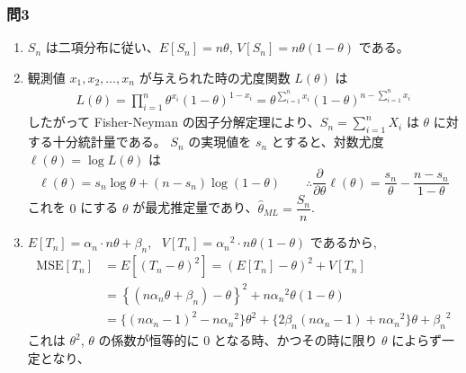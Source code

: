\documentclass[./main.tex]{subfiles}
\begin{document}
    \subsubsection*{問3}

    \begin{enumerate}
        \item $S_n$ は二項分布に従い、$E[ S_n ] = n \theta$, $V[S_n] = n \theta (1 - \theta)$ である。
        \item 観測値 $x_1, x_2, \dots, x_n$ が与えられた時の尤度関数 $L(\theta)$ は
        \begin{align*}
            L(\theta)
                = \prod_{i=1}^{n} \theta^{x_i} (1 - \theta)^{1 - x_i}
                = \theta^{\sum_{i=1}^{n} x_i} (1 - \theta)^{n -\sum_{i=1}^{n} x_i}
        \end{align*}
        したがって Fisher-Neyman の因子分解定理により、$S_n = \displaystyle \sum_{i=1}^n X_i$ は $\theta$ に対する十分統計量である。
        $S_n$ の実現値を $s_n$ とすると、対数尤度 $\ell (\theta) = \log L(\theta)$ は
        \begin{equation*}
            \ell (\theta)
                = s_n \log \theta + (n - s_n) \log (1-\theta)
            \qquad
            \therefore
            \frac{\partial}{\partial \theta} \ell (\theta)
                = \frac{s_n}{\theta} - \frac{n - s_n}{1 - \theta}
        \end{equation*}
        これを $0$ にする $\theta$ が最尤推定量であり、$\hat{\theta}_{ML} = \dfrac{S_n}{n}$.
        \item $E [T_n] = \alpha_n \cdot n\theta + \beta_n$, \ $V [T_n] = {\alpha_n}^2 \cdot n \theta (1-\theta)$ であるから,
        \begin{align*}
            \mathrm{MSE} [T_n] 
                &= E [ (T_n - \theta)^2 ] 
                    = ( E [ T_n] - \theta )^2 + V [T_n]\\
                &= \left\{ (n \alpha_n \theta + \beta_n) - \theta  \right\}^2
                    + n {\alpha_n}^2 \theta (1 - \theta)\\
                &= \{ (n \alpha_n - 1)^2 - n {\alpha_n}^2 \} \theta^2
                    + \{ 2\beta_n (n \alpha_n - 1) + n {\alpha_n}^2 \} \theta
                    + {\beta_n}^2
        \end{align*}
        これは $\theta^2$, $\theta$ の係数が恒等的に $0$ となる時、かつその時に限り $\theta$ によらず一定となり、

\end{enumerate}
\end{document}
